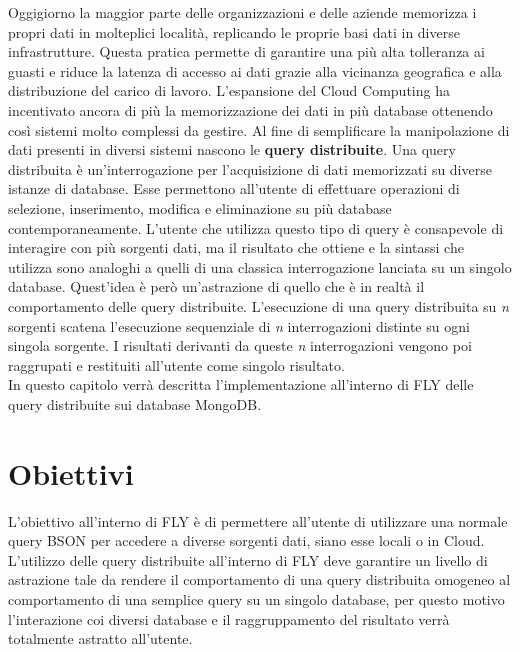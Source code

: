 Oggigiorno la maggior parte delle organizzazioni e delle aziende memorizza i propri dati in molteplici località, replicando le proprie basi dati in diverse infrastrutture. Questa pratica permette di garantire una più alta tolleranza ai guasti e riduce la latenza di accesso ai dati grazie alla vicinanza geografica e alla distribuzione del carico di lavoro. L'espansione del Cloud Computing ha incentivato ancora di più la memorizzazione dei dati in più database ottenendo così sistemi molto complessi da gestire. Al fine di semplificare la manipolazione di dati presenti in diversi sistemi nascono le \textbf{query distribuite}. Una query distribuita è un'interrogazione per l'acquisizione di dati memorizzati su diverse istanze di database. Esse permettono all'utente di effettuare operazioni di selezione, inserimento, modifica e eliminazione su più database contemporaneamente. L'utente che utilizza questo tipo di query è consapevole di interagire con più sorgenti dati, ma il risultato che ottiene e la sintassi che utilizza sono analoghi a quelli di una classica interrogazione lanciata su un singolo database. Quest'idea è però un'astrazione di quello che è in realtà il comportamento delle query distribuite. L'esecuzione di una query distribuita su \textit{n} sorgenti  scatena l'esecuzione sequenziale di \textit{n} interrogazioni distinte su ogni singola sorgente. I risultati derivanti da queste \textit{n} interrogazioni vengono poi raggrupati e restituiti all'utente come singolo risultato. \\
In questo capitolo verrà descritta l'implementazione all'interno di FLY delle query distribuite sui database MongoDB.

\section{Obiettivi}
L'obiettivo all'interno di FLY è di permettere all'utente di utilizzare una normale query BSON per accedere a diverse sorgenti dati, siano esse locali o in Cloud. L'utilizzo delle query distribuite all'interno di FLY deve garantire un livello di astrazione tale da rendere il comportamento di una query distribuita omogeneo al comportamento di una semplice query su un singolo database, per questo motivo l'interazione coi diversi database e il raggruppamento del risultato verrà totalmente astratto all'utente.

